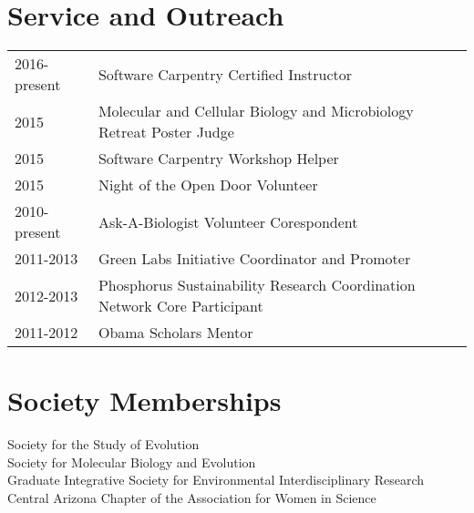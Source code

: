 \documentclass[11pt]{article}
\begin{document}
\section*{Service and Outreach}
\begin{tabularx}{\linewidth}{lX}
2016-present & Software Carpentry Certified Instructor\\
2015 &Molecular and Cellular Biology and Microbiology Retreat Poster Judge\\
2015 &Software Carpentry Workshop Helper\\
2015 &Night of the Open Door Volunteer\\
2010-present &Ask-A-Biologist Volunteer Corespondent\\
2011-2013&Green Labs Initiative Coordinator and Promoter\\
2012-2013&Phosphorus Sustainability Research Coordination Network Core Participant\\
2011-2012&Obama Scholars Mentor\\
\end{tabularx}
\section*{Society Memberships}
Society for the Study of Evolution\\
Society for Molecular Biology and Evolution\\
Graduate Integrative Society for Environmental Interdisciplinary Research\\
Central Arizona Chapter of the Association for Women in Science
\end{document}
